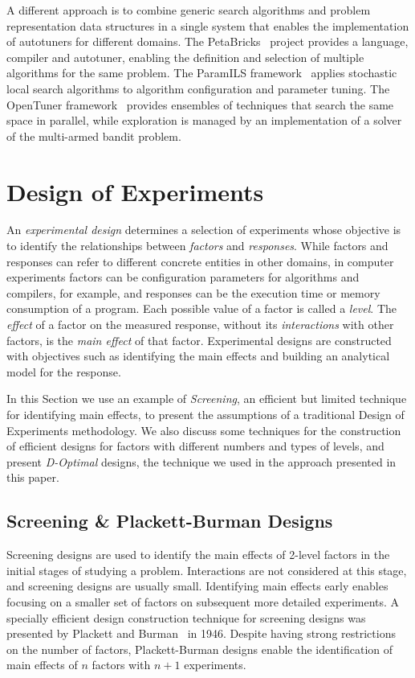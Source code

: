 \documentclass[conference]{IEEEtran}
\begin{document}
A different approach is to combine generic search algorithms and problem
representation data structures in a single system that enables the
implementation of autotuners for different domains. The
PetaBricks~\cite{ansel2009petabricks} project provides a language,
compiler and autotuner, enabling the definition and selection of multiple
algorithms for the same problem. The ParamILS
framework~\cite{hutter2009paramils} applies stochastic local search
algorithms to algorithm configuration and parameter tuning. The OpenTuner
framework~\cite{ansel2014opentuner} provides ensembles of techniques that
search the same space in parallel, while exploration is managed by an
implementation of a solver of the multi-armed bandit problem.
\section{Design of Experiments}
\label{sec:org832b334}
An \emph{experimental design} determines a selection of experiments whose objective
is to identify the relationships between \emph{factors} and \emph{responses}. While
factors and responses can refer to different concrete entities in other domains,
in computer experiments factors can be configuration parameters for algorithms
and compilers, for example, and responses can be the execution time or memory
consumption of a program. Each possible value of a factor is called a \emph{level}.
The \emph{effect} of a factor on the measured response, without its \emph{interactions}
with other factors, is the \emph{main effect} of that factor. Experimental designs
are constructed with objectives such as identifying the main effects and
building an analytical model for the response.

In this Section we use an example of \emph{Screening}, an efficient but limited
technique for identifying main effects, to present the assumptions of a
traditional Design of Experiments methodology. We also discuss some techniques
for the construction of efficient designs for factors with different numbers and
types of levels, and present \emph{D-Optimal} designs, the technique we used in the
approach presented in this paper.
\subsection{Screening \& Plackett-Burman Designs}
\label{sec:org4911801}
Screening designs are used to identify the main effects of 2-level factors in
the initial stages of studying a problem. Interactions are not considered at
this stage, and screening designs are usually small. Identifying main effects
early enables focusing on a smaller set of factors on subsequent more detailed
experiments. A specially efficient design construction technique for screening
designs was presented by Plackett and Burman~\cite{plackett1946design}
in 1946. Despite having strong restrictions on the number of factors,
Plackett-Burman designs enable the identification of main effects of \(n\) factors
with \(n + 1\) experiments.
\end{document}
